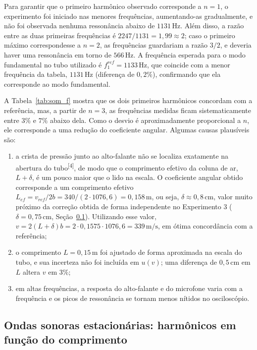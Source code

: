 \documentclass[12pt, a4paper]{article}
\newcommand{\un}[1]{\,\mathrm{#1}}
\newcommand{\cita}[1]{\textsuperscript{[#1]}}
\begin{document}
Para garantir que o primeiro harmônico observado corresponde a $n=1$, o experimento foi iniciado nas menores frequências, aumentando-as gradualmente, e não foi observada nenhuma ressonância abaixo de $1131\un{Hz}$. Além disso, a razão entre as duas primeiras frequências é $2247/1131=1{,}99\approx2$; caso o primeiro máximo correspondesse a $n=2$, as frequências guardariam a razão $3/2$, e deveria haver uma ressonância em torno de $566\un{Hz}$. A frequência esperada para o modo fundamental no tubo utilizado é $f_1^{ref}=1133\un{Hz}$, que coincide com a menor frequência da tabela, $1131\un{Hz}$ (diferença de $0{,}2\%$), confirmando que ela corresponde ao modo fundamental.

A Tabela~\ref{tab:som_f} mostra que os dois primeiros harmônicos concordam com a referência, mas, a partir de $n=3$, as frequências medidas ficam sistematicamente entre $3\%$ e $7\%$ abaixo dela. Como o desvio é aproximadamente proporcional a $n$, ele corresponde a uma redução do coeficiente angular. Algumas causas plausíveis são:
\begin{enumerate}
    \item a crista de pressão junto ao alto-falante não se localiza exatamente na abertura do tubo\cita{4}, de modo que o comprimento efetivo da coluna de ar, $L+\delta$, é um pouco maior que o lido na escala. O coeficiente angular obtido corresponde a um comprimento efetivo $L_{ef}=v_{ref}/2b=340/(2\cdot1076{,}6)=0{,}158\un{m}$, ou seja, $\delta\approx0{,}8\un{cm}$, valor muito próximo da correção obtida de forma independente no Experimento 3 ($\delta=0{,}75\un{cm}$, Seção~\ref{sec:som_L}). Utilizando esse valor, $v=2(L+\delta)b=2\cdot0{,}1575\cdot1076{,}6=339\un{m/s}$, em ótima concordância com a referência;
    \item o comprimento $L=0{,}15\un{m}$ foi ajustado de forma aproximada na escala do tubo, e sua incerteza não foi incluída em $u(v)$; uma diferença de $0{,}5\un{cm}$ em $L$ altera $v$ em $3\%$;
    \item em altas frequências, a resposta do alto-falante e do microfone varia com a frequência e os picos de ressonância se tornam menos nítidos no osciloscópio.
\end{enumerate}

\subsection{Ondas sonoras estacionárias: harmônicos em função do comprimento}
\label{sec:som_L}
\end{document}
